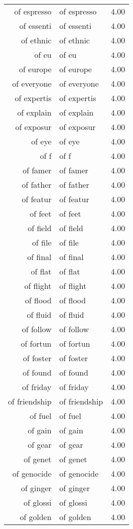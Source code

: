 \begin{table}[ht]
\begin{tabular}{rlr}
  of espresso & of espresso & 4.00 \\ 
  of essenti & of essenti & 4.00 \\ 
  of ethnic & of ethnic & 4.00 \\ 
  of eu & of eu & 4.00 \\ 
  of europe & of europe & 4.00 \\ 
  of everyone & of everyone & 4.00 \\ 
  of expertis & of expertis & 4.00 \\ 
  of explain & of explain & 4.00 \\ 
  of exposur & of exposur & 4.00 \\ 
  of eye & of eye & 4.00 \\ 
  of f & of f & 4.00 \\ 
  of famer & of famer & 4.00 \\ 
  of father & of father & 4.00 \\ 
  of featur & of featur & 4.00 \\ 
  of feet & of feet & 4.00 \\ 
  of field & of field & 4.00 \\ 
  of file & of file & 4.00 \\ 
  of final & of final & 4.00 \\ 
  of flat & of flat & 4.00 \\ 
  of flight & of flight & 4.00 \\ 
  of flood & of flood & 4.00 \\ 
  of fluid & of fluid & 4.00 \\ 
  of follow & of follow & 4.00 \\ 
  of fortun & of fortun & 4.00 \\ 
  of foster & of foster & 4.00 \\ 
  of found & of found & 4.00 \\ 
  of friday & of friday & 4.00 \\ 
  of friendship & of friendship & 4.00 \\ 
  of fuel & of fuel & 4.00 \\ 
  of gain & of gain & 4.00 \\ 
  of gear & of gear & 4.00 \\ 
  of genet & of genet & 4.00 \\ 
  of genocide & of genocide & 4.00 \\ 
  of ginger & of ginger & 4.00 \\ 
  of glossi & of glossi & 4.00 \\ 
  of golden & of golden & 4.00 \\ 

\end{tabular}
\end{table}
